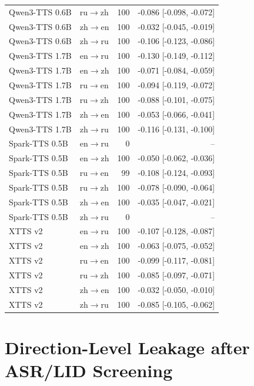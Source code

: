 \documentclass[11pt]{article}
\begin{document}
\begin{longtable}{llrr}
Qwen3-TTS 0.6B & ru$\rightarrow$zh & 100 & -0.086 [-0.098, -0.072] \\
Qwen3-TTS 0.6B & zh$\rightarrow$en & 100 & -0.032 [-0.045, -0.019] \\
Qwen3-TTS 0.6B & zh$\rightarrow$ru & 100 & -0.106 [-0.123, -0.086] \\
Qwen3-TTS 1.7B & en$\rightarrow$ru & 100 & -0.130 [-0.149, -0.112] \\
Qwen3-TTS 1.7B & en$\rightarrow$zh & 100 & -0.071 [-0.084, -0.059] \\
Qwen3-TTS 1.7B & ru$\rightarrow$en & 100 & -0.094 [-0.119, -0.072] \\
Qwen3-TTS 1.7B & ru$\rightarrow$zh & 100 & -0.088 [-0.101, -0.075] \\
Qwen3-TTS 1.7B & zh$\rightarrow$en & 100 & -0.053 [-0.066, -0.041] \\
Qwen3-TTS 1.7B & zh$\rightarrow$ru & 100 & -0.116 [-0.131, -0.100] \\
Spark-TTS 0.5B & en$\rightarrow$ru & 0 & -- \\
Spark-TTS 0.5B & en$\rightarrow$zh & 100 & -0.050 [-0.062, -0.036] \\
Spark-TTS 0.5B & ru$\rightarrow$en & 99 & -0.108 [-0.124, -0.093] \\
Spark-TTS 0.5B & ru$\rightarrow$zh & 100 & -0.078 [-0.090, -0.064] \\
Spark-TTS 0.5B & zh$\rightarrow$en & 100 & -0.035 [-0.047, -0.021] \\
Spark-TTS 0.5B & zh$\rightarrow$ru & 0 & -- \\
XTTS v2 & en$\rightarrow$ru & 100 & -0.107 [-0.128, -0.087] \\
XTTS v2 & en$\rightarrow$zh & 100 & -0.063 [-0.075, -0.052] \\
XTTS v2 & ru$\rightarrow$en & 100 & -0.099 [-0.117, -0.081] \\
XTTS v2 & ru$\rightarrow$zh & 100 & -0.085 [-0.097, -0.071] \\
XTTS v2 & zh$\rightarrow$en & 100 & -0.032 [-0.050, -0.010] \\
XTTS v2 & zh$\rightarrow$ru & 100 & -0.085 [-0.105, -0.062] \\
\bottomrule
\end{longtable}

\section{Direction-Level Leakage after ASR/LID Screening}
\label{app:successful_leakage_directions}
\end{document}
